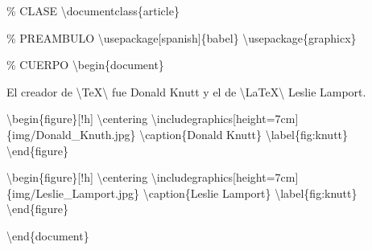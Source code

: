 \documentclass[
  a4paper,
]{scrreport}
\newenvironment{Shaded}{\begin{snugshade}}{\end{snugshade}}
\newcommand{\BuiltInTok}[1]{\textcolor[rgb]{0.00,0.23,0.31}{#1}}
\newcommand{\CommentTok}[1]{\textcolor[rgb]{0.37,0.37,0.37}{#1}}
\newcommand{\ExtensionTok}[1]{\textcolor[rgb]{0.00,0.23,0.31}{#1}}
\newcommand{\FunctionTok}[1]{\textcolor[rgb]{0.28,0.35,0.67}{#1}}
\newcommand{\KeywordTok}[1]{\textcolor[rgb]{0.00,0.23,0.31}{#1}}
\newcommand{\NormalTok}[1]{\textcolor[rgb]{0.00,0.23,0.31}{#1}}
\theoremstyle{definition}
\theoremstyle{remark}
\begin{document}
\begin{tcolorbox}[enhanced jigsaw, left=2mm, colbacktitle=quarto-callout-tip-color!10!white, toprule=.15mm, coltitle=black, leftrule=.75mm, arc=.35mm, colback=white, opacitybacktitle=0.6, rightrule=.15mm, colframe=quarto-callout-tip-color-frame, title=\textcolor{quarto-callout-tip-color}{\faLightbulb}\hspace{0.5em}{Solución}, bottomrule=.15mm, breakable, opacityback=0, bottomtitle=1mm, toptitle=1mm, titlerule=0mm]

\begin{Shaded}
\begin{Highlighting}[]
\CommentTok{\% CLASE}
\BuiltInTok{\textbackslash{}documentclass}\NormalTok{\{}\ExtensionTok{article}\NormalTok{\}}

\CommentTok{\% PREAMBULO}
\BuiltInTok{\textbackslash{}usepackage}\NormalTok{[spanish]\{}\ExtensionTok{babel}\NormalTok{\}}
\BuiltInTok{\textbackslash{}usepackage}\NormalTok{\{}\ExtensionTok{graphicx}\NormalTok{\}}

\CommentTok{\% CUERPO}
\KeywordTok{\textbackslash{}begin}\NormalTok{\{}\ExtensionTok{document}\NormalTok{\}}

\NormalTok{El creador de }\FunctionTok{\textbackslash{}TeX\textbackslash{} }\NormalTok{fue Donald Knutt y el de }\FunctionTok{\textbackslash{}LaTeX\textbackslash{} }\NormalTok{Leslie Lamport.}

\KeywordTok{\textbackslash{}begin}\NormalTok{\{}\ExtensionTok{figure}\NormalTok{\}[!h]}
  \FunctionTok{\textbackslash{}centering}
  \BuiltInTok{\textbackslash{}includegraphics}\NormalTok{[height=7cm]\{}\ExtensionTok{img/Donald\_Knuth.jpg}\NormalTok{\}}
  \FunctionTok{\textbackslash{}caption}\NormalTok{\{Donald Knutt\}}
  \KeywordTok{\textbackslash{}label}\NormalTok{\{}\ExtensionTok{fig:knutt}\NormalTok{\}}
\KeywordTok{\textbackslash{}end}\NormalTok{\{}\ExtensionTok{figure}\NormalTok{\}}

\KeywordTok{\textbackslash{}begin}\NormalTok{\{}\ExtensionTok{figure}\NormalTok{\}[!h]}
  \FunctionTok{\textbackslash{}centering}
  \BuiltInTok{\textbackslash{}includegraphics}\NormalTok{[height=7cm]\{}\ExtensionTok{img/Leslie\_Lamport.jpg}\NormalTok{\}}
  \FunctionTok{\textbackslash{}caption}\NormalTok{\{Leslie Lamport\}}
  \KeywordTok{\textbackslash{}label}\NormalTok{\{}\ExtensionTok{fig:knutt}\NormalTok{\}}
  \KeywordTok{\textbackslash{}end}\NormalTok{\{}\ExtensionTok{figure}\NormalTok{\}}

\KeywordTok{\textbackslash{}end}\NormalTok{\{}\ExtensionTok{document}\NormalTok{\}}
\end{Highlighting}
\end{Shaded}

\end{tcolorbox}
\end{document}
